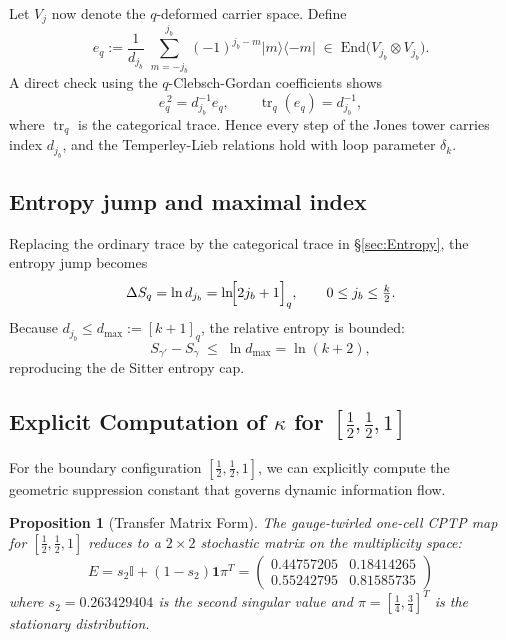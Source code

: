 \documentclass[11pt]{article}
\newtheorem{proposition}{Proposition}[section]
\begin{document}
Let $V_j$ now denote the $q$-deformed carrier space.
Define
\[
  e_q
  :=
  \frac{1}{d_{j_b}}\;
  \sum_{m=-j_b}^{j_b}
  (-1)^{j_b-m}
  |m\rangle\!\langle{-m}|
  \;\in\;
  \mathrm{End}\bigl(V_{j_b}\!\otimes\!V_{j_b}\bigr).
\]
A direct check using the $q$-Clebsch-Gordan coefficients shows
\[
  e_q^{\,2}=d_{j_b}^{-1}e_q,
  \qquad
  \operatorname{tr}_q(e_q)=d_{j_b}^{-1},
\]
where $\operatorname{tr}_q$ is the categorical trace.  Hence every step of
the Jones tower carries index $d_{j_b}$, and the Temperley-Lieb relations
hold with loop parameter $\delta_k$.

\subsection{Entropy jump and maximal index}

Replacing the ordinary trace by the categorical trace in
\S\ref{sec:Entropy}, the entropy jump becomes
\[
  \Delta S_q
  =\ln d_{j_b}
  =\ln\!\Bigl[2j_b+1\Bigr]_q,
  \qquad
  0\le j_b\le\tfrac{k}{2}.
\]
Because $d_{j_b}\le d_{\max}:=[k+1]_q$, the relative entropy is bounded:
\[
  S_{\gamma'}-S_{\gamma}
  \;\le\;
  \ln d_{\max}
  =\ln(k+2),
\]
reproducing the de Sitter entropy cap.

\subsection{Explicit Computation of $\kappa$ for $[\frac{1}{2}, \frac{1}{2}, 1]$}

For the boundary configuration $[\frac{1}{2}, \frac{1}{2}, 1]$, we can explicitly compute the geometric suppression constant that governs dynamic information flow.

\begin{proposition}[Transfer Matrix Form]
  The gauge-twirled one-cell CPTP map for $[\frac{1}{2}, \frac{1}{2}, 1]$ reduces to a $2 \times 2$ stochastic matrix on the multiplicity space:
  \begin{equation}
    E = s_2 \mathbb{I} + (1-s_2) \mathbf{1} \pi^T =
    \begin{pmatrix}
      0.44757205 & 0.18414265 \\
      0.55242795 & 0.81585735
    \end{pmatrix}
  \end{equation}
  where $s_2 = 0.263429404$ is the second singular value and $\pi = [\frac{1}{4}, \frac{3}{4}]^T$ is the stationary distribution.
\end{proposition}
\end{document}
